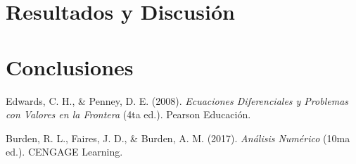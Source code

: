 \documentclass[a4paper,10pt,twocolumn]{article}
\begin{document}
\section{Resultados y Discusión}\label{sec:resultados}



\section{Conclusiones}\label{sec:conclusiones}




\begin{thebibliography}{99}

Edwards, C. H., \& Penney, D. E. (2008).
\textit{Ecuaciones Diferenciales y Problemas con Valores en la Frontera} (4ta ed.).
Pearson Educación.

Burden, R. L., Faires, J. D., \& Burden, A. M. (2017).
\textit{Análisis Numérico} (10ma ed.).
CENGAGE Learning.


\end{thebibliography}


\label{end}
\end{document}
